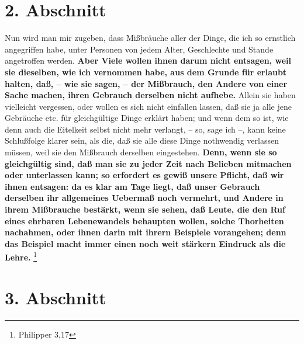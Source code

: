 \section{2. Abschnitt} \label{kap18_ab2}

Nun wird man mir zugeben, dass Mißbräuche aller der Dinge, die ich so ernstlich
angegriffen habe, unter Personen von jedem Alter, Geschlechte und Stande
angetroffen werden. \textbf{Aber Viele wollen ihnen darum nicht entsagen, weil
sie
dieselben, wie ich vernommen habe, aus dem Grunde für erlaubt halten, daß, --
wie sie sagen, -- der Mißbrauch, den Andere von einer Sache  machen, ihren
Gebrauch derselben nicht aufhebe.} Allein sie haben vielleicht vergessen, oder
wollen es sich nicht einfallen lassen, daß sie ja alle jene Gebräuche etc. für
gleichgültige Dinge erklärt haben; und wenn dem so ist, wie denn auch die
Eitelkeit selbst nicht mehr verlangt, -- so, sage ich --, kann keine Schlußfolge
klarer sein, als die, daß sie alle diese Dinge nothwendig verlassen müssen, weil
sie den Mißbrauch derselben eingestehen. \textbf{Denn, wenn sie so gleichgültig
sind,
daß man sie zu jeder Zeit nach Belieben mitmachen oder unterlassen kann; so
erfordert es gewiß unsere Pflicht, daß wir ihnen entsagen: da es klar am Tage
liegt, daß unser Gebrauch derselben ihr allgemeines Uebermaß noch vermehrt, und
Andere in ihrem Mißbrauche bestärkt, wenn sie sehen, daß Leute, die den Ruf
eines ehrbaren Lebenewandels behaupten wollen, solche Thorheiten nachahmen, oder
ihnen darin mit ihrern Beispiele vorangehen; denn das Beispiel macht immer einen
noch weit stärkern Eindruck als die Lehre.}
\footnote{Philipper 3,17}

\section{3. Abschnitt} \label{kap18_ab3}

